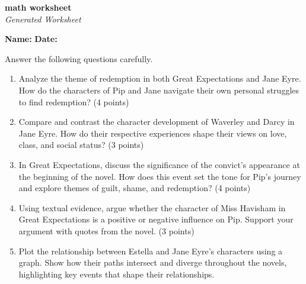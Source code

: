 \documentclass{article}
\begin{document}
\begin{center}
    \Huge \textbf{ math worksheet } \\[0.5cm]
    \large \textit{Generated Worksheet}
\end{center}

\vspace{1cm}

\noindent \textbf{Name:} \underline{\hspace{6cm}} \hfill \textbf{Date:} \underline{\hspace{4cm}}

\vspace{1cm}

Answer the following questions carefully.

\vspace{0.5cm}

\begin{enumerate}
\item Analyze the theme of redemption in both Great Expectations and Jane Eyre. How do the characters of Pip and Jane navigate their own personal struggles to find redemption? (4 points) \vspace{2cm} \item Compare and contrast the character development of Waverley and Darcy in Jane Eyre. How do their respective experiences shape their views on love, class, and social status? (3 points) \vspace{2cm} \item In Great Expectations, discuss the significance of the convict's appearance at the beginning of the novel. How does this event set the tone for Pip's journey and explore themes of guilt, shame, and redemption? (4 points) \vspace{2cm} \item Using textual evidence, argue whether the character of Miss Havisham in Great Expectations is a positive or negative influence on Pip. Support your argument with quotes from the novel. (3 points) \vspace{2cm} \item Plot the relationship between Estella and Jane Eyre's characters using a graph. Show how their paths intersect and diverge throughout the novels, highlighting key events that shape their relationships. \vspace{2cm}
\end{enumerate}
\end{document}
